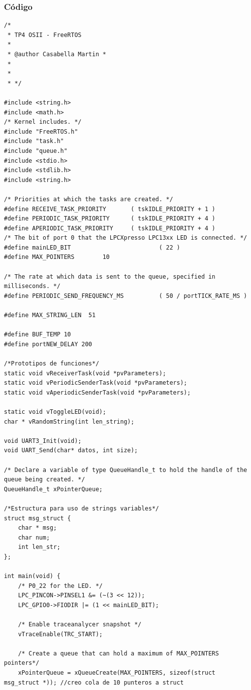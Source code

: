 \documentclass{article}
\begin{document}
\clearpage


\subsubsection{Código}
\begin{lstlisting}[style=CStyle]
/*
 * TP4 OSII - FreeRTOS
 *
 * @author Casabella Martin *
 *
 *
 * */

#include <string.h>
#include <math.h>
/* Kernel includes. */
#include "FreeRTOS.h"
#include "task.h"
#include "queue.h"
#include <stdio.h>
#include <stdlib.h>
#include <string.h>

/* Priorities at which the tasks are created. */
#define RECEIVE_TASK_PRIORITY		( tskIDLE_PRIORITY + 1 )
#define	PERIODIC_TASK_PRIORITY		( tskIDLE_PRIORITY + 4 )
#define	APERIODIC_TASK_PRIORITY		( tskIDLE_PRIORITY + 4 )
/* The bit of port 0 that the LPCXpresso LPC13xx LED is connected. */
#define mainLED_BIT 						( 22 )
#define MAX_POINTERS		10

/* The rate at which data is sent to the queue, specified in milliseconds. */
#define PERIODIC_SEND_FREQUENCY_MS			( 50 / portTICK_RATE_MS )

#define MAX_STRING_LEN	51

#define BUF_TEMP 10
#define portNEW_DELAY 200

/*Prototipos de funciones*/
static void vReceiverTask(void *pvParameters);
static void vPeriodicSenderTask(void *pvParameters);
static void vAperiodicSenderTask(void *pvParameters);

static void vToggleLED(void);
char * vRandomString(int len_string);

void UART3_Init(void);
void UART_Send(char* datos, int size);

/* Declare a variable of type QueueHandle_t to hold the handle of the queue being created. */
QueueHandle_t xPointerQueue;

/*Estructura para uso de strings variables*/
struct msg_struct {
	char * msg;
	char num;
	int len_str;
};

int main(void) {
	/* P0_22 for the LED. */
	LPC_PINCON->PINSEL1 &= (~(3 << 12));
	LPC_GPIO0->FIODIR |= (1 << mainLED_BIT);

	/* Enable traceanalycer snapshot */
	vTraceEnable(TRC_START);

	/* Create a queue that can hold a maximum of MAX_POINTERS pointers*/
	xPointerQueue = xQueueCreate(MAX_POINTERS, sizeof(struct msg_struct *)); //creo cola de 10 punteros a struct


\end{lstlisting}
\end{document}
